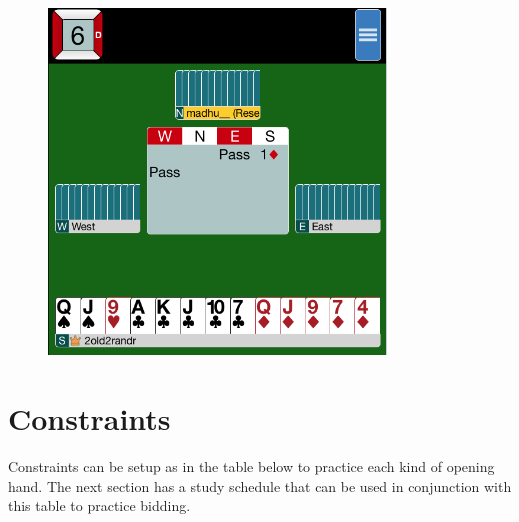 \documentclass[a4paper,article,oneside]{memoir}
\begin{document}
\begin{figure}[htbp]
  \centering
  \includegraphics[width=0.8\textwidth]{sample-deal.png}
  \label{sampledeal}
\end{figure}

\section{Constraints}

Constraints can be setup as in the table below to practice each kind
of opening hand. The next section has a study schedule that can be
used in conjunction with this table to practice bidding.
\end{document}
